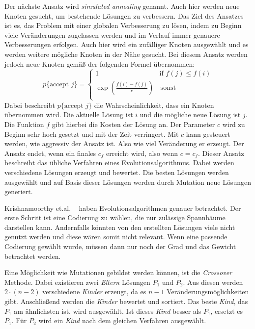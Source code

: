 Der nächste Ansatz wird \emph{simulated annealing} genannt.
Auch hier werden neue Knoten gesucht, um bestehende Lösungen zu verbessern.
Das Ziel des Ansatzes ist es, das Problem mit einer globalen Verbesserung zu lösen, indem zu Beginn viele Veränderungen zugelassen werden und im Verlauf immer genauere Verbesserungen erfolgen.
Auch hier wird ein zufälliger Knoten ausgewählt und es werden weitere mögliche Knoten in der Nähe gesucht.
Bei diesem Ansatz werden jedoch neue Knoten gemäß der folgenden Formel übernommen:
\[
p\{\textrm{accept }j\} = \left\{
  \begin{array}{ll}
  1 & \textrm{if } f(j) \leq f(i) \\
  \exp{\left(\frac{f(i) - f(j)}{c}\right)} & \, \textrm{sonst} \\
  \end{array}
  \right.
\]
Dabei beschreibt \( p\{\textrm{accept }j\} \) die Wahrscheinlichkeit, dass ein Knoten übernommen wird.
Die aktuelle Lösung ist \(i\) und die mögliche neue Lösung ist \(j\).
Die Funktion \(f\) gibt hierbei die Kosten der Lösung an.
Der Parameter \(c\) wird zu Beginn sehr hoch gesetzt und mit der Zeit verringert.
Mit \(c\) kann gesteuert werden, wie aggressiv der Ansatz ist.
Also wie viel Veränderung er erzeugt.
Der Ansatz endet, wenn ein finales \(c_f\) erreicht wird, also wenn \(c = c_f\).
Dieser Ansatz beschreibt das übliche Verfahren eines Evolutionsalgorithmus.
Dabei werden verschiedene Lösungen erzeugt und bewertet.
Die besten Lösungen werden ausgewählt und auf Basis dieser Lösungen werden durch Mutation neue Lösungen generiert.

Krishnamoorthy et.al. ~\cite{Comparison_of_Algorithms_for_the_Degree_Constrained_Minimum_Spanning_Tree} haben Evolutionsalgorithmen genauer betrachtet.
Der erste Schritt ist eine Codierung zu wählen, die nur zulässige Spannbäume darstellen kann.
Andernfalls könnten von den erstellten Lösungen viele nicht genutzt werden und diese wären somit nicht relevant.
Wenn eine passende Codierung gewählt wurde, müssen dann nur noch der Grad und das Gewicht betrachtet werden.

Eine Möglichkeit wie Mutationen gebildet werden können, ist die \emph{Crossover} Methode.
Dabei existieren zwei \emph{Eltern} Lösungen \(P_1\) und \(P_2\). Aus diesen werden
\(
2 \cdot (n - 2)
\)
verschiedene \emph{Kinder} erzeugt, da es \(n - 1\) Veränderungsmöglichkeiten gibt.
Anschließend werden die \emph{Kinder} bewertet und sortiert.
Das beste \emph{Kind}, das \(P_1\) am ähnlichsten ist, wird ausgewählt.
Ist dieses \emph{Kind} besser als \(P_1\), ersetzt es \(P_1\).
Für \(P_2\) wird ein \emph{Kind} nach dem gleichen Verfahren ausgewählt.

